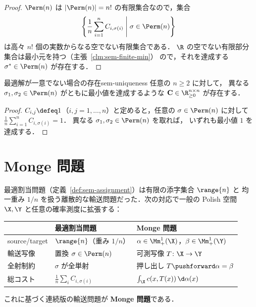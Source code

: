 \begin{proof}
  $\Perm(n)$ は $|\Perm(n)| = n!$ の有限集合なので，集合
  \[
    \left\{ \frac{1}{n}\sum_{i=1}^{n} C_{i, \sigma(i)} \;\middle|\; \sigma \in \Perm(n) \right\}
  \]
  は高々 $n!$ 個の実数からなる空でない有限集合である．
  $\R$ の空でない有限部分集合は最小元を持つ（主張~\ref{clm:sem-finite-min}）
  ので，それを達成する $\sigma^* \in \Perm(n)$ が存在する．
\end{proof}

\begin{claim}{最適解が一意でない場合の存在}{sem-uniqueness}
  任意の $n \geq 2$ に対して，
  異なる $\sigma_1, \sigma_2 \in \Perm(n)$ がともに最小値を達成するような
  $\mathbf{C} \in \R_{\geq 0}^{n \times n}$ が存在する．
\end{claim}

\begin{proof}
  $C_{i,j} \defeq 1$（$i, j = 1, \ldots, n$）と定めると，任意の $\sigma \in \Perm(n)$ に対して
  $\frac{1}{n}\sum_{i=1}^{n} C_{i, \sigma(i)} = 1$．
  異なる $\sigma_1, \sigma_2 \in \Perm(n)$ を取れば，
  いずれも最小値 $1$ を達成する．
\end{proof}

\section{Monge 問題}
\label{sec:sem-monge}

最適割当問題（定義~\ref{def:sem-assignment}）は有限の添字集合 $\range{n}$ と
均一重み $1/n$ を扱う離散的な輸送問題だった．次の対応で一般の Polish 空間
$\X, \Y$ と任意の確率測度に拡張する：
\begin{center}
  \begin{tabular}{l|ll}
    & 最適割当問題 & Monge 問題 \\ \hline
    source/target & $\range{n}$（重み $1/n$） & $\alpha \in \Mm_+^1(\X)$，$\beta \in \Mm_+^1(\Y)$ \\
    輸送写像 & 置換 $\sigma \in \Perm(n)$ & 可測写像 $T \colon \X \to \Y$ \\
    全射制約 & $\sigma$ が全単射 & 押し出し $T\pushforward \alpha = \beta$ \\
    総コスト & $\frac{1}{n}\sum_i C_{i, \sigma(i)}$ & $\int_\X c(x, T(x))\, \d\alpha(x)$
  \end{tabular}
\end{center}
これに基づく連続版の輸送問題が \textbf{Monge 問題}である．

